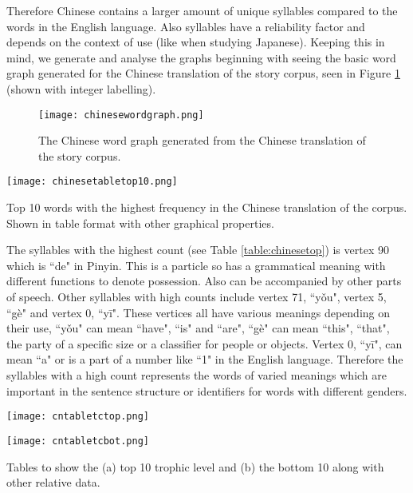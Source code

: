 Therefore Chinese contains a larger amount of unique syllables compared to the words in the English language. Also syllables have a reliability factor and depends on the context of use (like when studying Japanese). Keeping this in mind, we generate and analyse the graphs beginning with seeing the basic word graph generated for the Chinese translation of the story corpus, seen in Figure \ref{fig:cngraph} (shown with integer labelling).

\begin{figure}[!htb]
\centering
\texttt{[image: chinesewordgraph.png]}
\caption{The Chinese word graph generated from the Chinese translation of the story corpus.}
\label{fig:cngraph}
\end{figure}

\begin{table}[!htb]
\centering
\texttt{[image: chinesetabletop10.png]}
\caption{Top 10 words with the highest frequency in the Chinese translation of the corpus. Shown in table format with other graphical properties. }
\label{table:chinesetop}
\end{table}

The syllables with the highest count (see Table \ref{table:chinesetop}) is vertex 90 which is ``de" in Pinyin. This is a particle so has a grammatical meaning with different functions to denote possession. Also can be accompanied by other parts of speech. Other syllables with high counts include vertex 71, ``yǒu", vertex 5, ``gè" and vertex 0, ``yī". These vertices all have various meanings depending on their use, ``yǒu" can mean ``have", ``is" and ``are", ``gè" can mean ``this", ``that", the party of a specific size or a classifier for people or objects. Vertex 0, ``yī", can mean ``a" or is a part of a number like ``1" in the English language. Therefore the syllables with a high count represents the words of varied meanings which are important in the sentence structure or identifiers for words with different genders.

\begin{table}[!htb]
\centering
\begin{subtable}{.45\textwidth}
	\centering
	\texttt{[image: cntabletctop.png]}
	\caption{}
	\label{table:chinesetoptc}
\end{subtable}
\hfill
\begin{subtable}{.45\textwidth}
	\centering
	\texttt{[image: cntabletcbot.png]}
	\caption{}
	\label{table:chinesebottc}
\end{subtable}
\caption{Tables to show the (a) top 10 trophic level and (b) the bottom 10 along with other relative data.}
\end{table}

